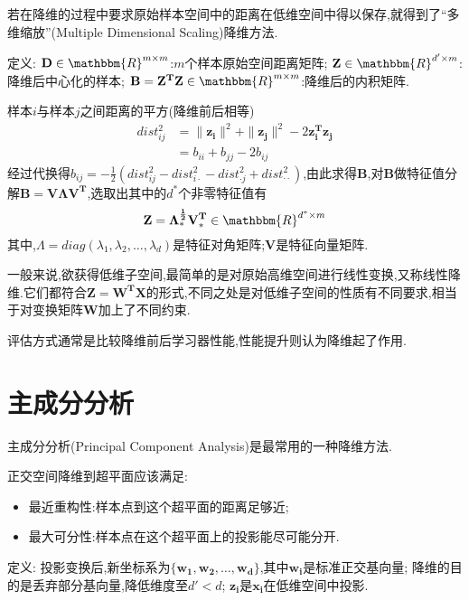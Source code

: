 若在降维的过程中要求原始样本空间中的距离在低维空间中得以保存,就得到了``多维缩放''(Multiple Dimensional Scaling)降维方法.

定义:  
$\mathbf{D}\in\mathbbm{R}^{m\times m}$:$m$个样本原始空间距离矩阵;  
$\mathbf{Z}\in\mathbbm{R}^{d'\times m}$:降维后中心化的样本;  
$\mathbf{B}=\mathbf{Z^TZ}\in\mathbbm{R}^{m\times m}$:降维后的内积矩阵.

样本$i$与样本$j$之间距离的平方(降维前后相等)
\begin{equation}\begin{split}
dist_{ij}^2&=\|\mathbf{z_i}\|^2+\|\mathbf{z_j}\|^2-2\mathbf{z_i^Tz_j}\\
&=b_{ii}+b_{jj}-2b_{ij}
\end{split}\end{equation}
经过代换得$b_{ij}=-\frac{1}{2}(dist_{ij}^2-dist_{i\cdot}^2-dist_{\cdot j}^2+dist_{\cdot\cdot}^2)$,由此求得$\mathbf{B}$,对$\mathbf{B}$做特征值分解$\mathbf{B=V\Lambda V^T}$,选取出其中的$d^\ast$个非零特征值有
\begin{equation}
\mathbf{Z=\Lambda_{\ast}^{\frac{1}{2}}V_{\ast}^T}\in\mathbbm{R}^{d^\ast\times m}
\end{equation}
其中,$\Lambda=diag(\lambda_1, \lambda_2, \dots, \lambda_d)$是特征对角矩阵;$\mathbf{V}$是特征向量矩阵.

一般来说,欲获得低维子空间,最简单的是对原始高维空间进行线性变换,又称线性降维.它们都符合$\mathbf{Z=W^TX}$的形式,不同之处是对低维子空间的性质有不同要求,相当于对变换矩阵$\mathbf{W}$加上了不同约束.

评估方式通常是比较降维前后学习器性能,性能提升则认为降维起了作用.

\section{主成分分析}

主成分分析(Principal Component Analysis)是最常用的一种降维方法.

正交空间降维到超平面应该满足:
\begin{itemize}
\item 最近重构性:样本点到这个超平面的距离足够近;
\item 最大可分性:样本点在这个超平面上的投影能尽可能分开.
\end{itemize}

定义:  
投影变换后,新坐标系为$\{\mathbf{w_1, w_2, \dots, w_d}\}$,其中$\mathbf{w_i}$是标准正交基向量;  
降维的目的是丢弃部分基向量,降低维度至$d'< d$;  
$\mathbf{z_i}$是$\mathbf{x_i}$在低维空间中投影.

